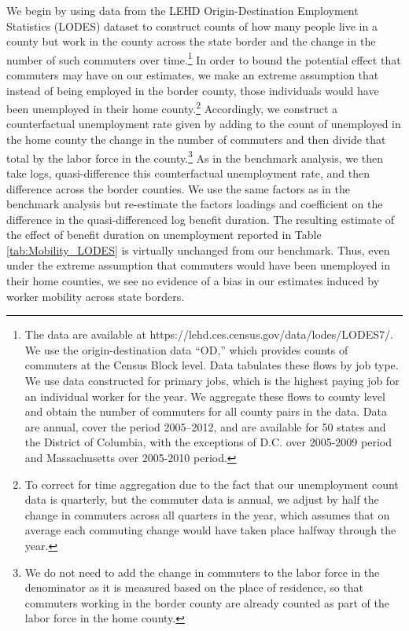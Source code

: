 \documentclass[12pt]{article}
\newcommand{\1}{\mathbf{1}}
\begin{document}
\begin{appendix}
We begin by using data from the LEHD Origin-Destination Employment Statistics (LODES) dataset \citep{data:census-lehd-lodes} to construct counts of how many people live in a county but work in the county across the state border and the change in the number of such commuters over time.\footnote{The data are available at https://lehd.ces.census.gov/data/lodes/LODES7/. We use the origin-destination data ``OD,'' which provides counts of commuters at the Census Block level. Data tabulates these flows by job type. We use data constructed for primary jobs, which is the highest paying job for an individual worker for the year. We
aggregate these flows to county level and obtain the number of commuters
for all county pairs in the data. Data are annual, cover the period
2005--2012, and are available for 50 states and the District of Columbia, with the exceptions of D.C. over 2005-2009 period and Massachusetts over 2005-2010 period.} In order to bound the potential effect that commuters may have on our estimates, we make an extreme assumption that instead of being employed in the border county, those individuals would have been unemployed in their home county.\footnote{To correct for time aggregation due to the fact that our unemployment count data is quarterly, but the commuter data is annual, we adjust by half the change in commuters across all quarters in the year, which assumes that on average each commuting change would have taken place halfway through the year.} Accordingly, we construct a counterfactual unemployment rate given by adding to the count of unemployed in the home county the change in the number of commuters and then divide that total by the labor force in the county.\footnote{We do not need to add the change in commuters to the labor force in the denominator as it is measured based on the place of residence, so that commuters working in the border county are already counted as part of the labor force in the home county.} As in the benchmark analysis, we then take logs, quasi-difference this counterfactual unemployment rate, and then difference across the border counties. We use the same factors as in the benchmark analysis but re-estimate the factors loadings and coefficient on the difference in the quasi-differenced log benefit duration. The resulting estimate of the effect of benefit duration on unemployment reported in Table \ref{tab:Mobility_LODES} is virtually unchanged from our benchmark. Thus, even under the extreme assumption that commuters would have been unemployed in their home counties, we see no evidence of a bias in our estimates induced by worker mobility across state borders.



\end{appendix}
\end{document}
